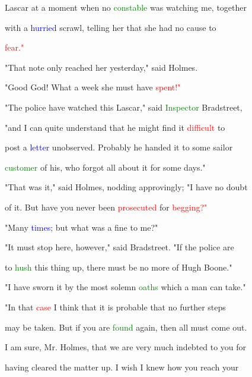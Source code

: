  Lascar at a moment when no \textcolor{green}{constable} was \textcolor{BurntOrange}{watching} me, together

 with a \textcolor{blue}{hurried} scrawl, telling her that she had no cause to

 \textcolor{red}{fear."}



 "That note only reached her yesterday," said Holmes.



 \textcolor{BurntOrange}{"Good} \textcolor{BurntOrange}{God!} What a week she must have \textcolor{red}{spent!"}



 "The \textcolor{BurntOrange}{police} have \textcolor{BurntOrange}{watched} this Lascar," said \textcolor{green}{Inspector} Bradstreet,

 "and I can quite understand that he might find it \textcolor{red}{difficult} to

 post a \textcolor{blue}{letter} unobserved. Probably he handed it to some sailor

 \textcolor{green}{customer} of his, who forgot all about it for some days."



 "That was it," said Holmes, nodding approvingly; "I have no \textcolor{BurntOrange}{doubt}

 of it. But have you never been \textcolor{red}{prosecuted} for \textcolor{red}{begging?"}



 "Many \textcolor{blue}{times;} but what was a fine to me?"



 "It must stop here, however," said Bradstreet. "If the \textcolor{BurntOrange}{police} are

 to \textcolor{green}{hush} this thing up, there must be no more of Hugh Boone."



 "I have sworn it by the most solemn \textcolor{green}{oaths} which a man can take."



 "In that \textcolor{red}{case} I think that it is probable that no further steps

 may be taken. But if you are \textcolor{green}{found} again, then all must come out.

 I am sure, Mr. Holmes, that we are very much indebted to you for

 having cleared the matter up. I wish I knew how you reach your

